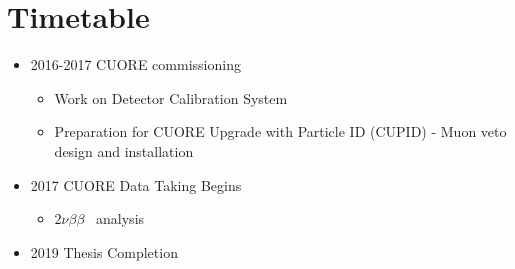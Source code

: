 \documentclass[12pt,a4paper]{article}
\newcommand{\twonubb}{$2\nu \beta \beta$}
\begin{document}
\section{Timetable}
\begin{itemize}
\item 2016-2017 CUORE commissioning
\begin{itemize}
\item Work on Detector Calibration System
\item Preparation for CUORE Upgrade with Particle ID (CUPID) - Muon veto design and installation
\end{itemize}
\item 2017 CUORE Data Taking Begins
\begin{itemize}
\item \twonubb~ analysis
\end{itemize}
\item 2019 Thesis Completion
\end{itemize}

\begin{comment}
\begin{thebibliography}{8}
\bibitem{Higgs-ATLAS}
ATLAS Collaboration. Phys. Lett. B \textbf{716} (2012) 1
\bibitem{Higgs-CMS}
CMS Collaboration. Phys. Lett. B \textbf{716} (2012) 30
\bibitem{Homestake Neutrino}
R. Davis, D. Harmer, K. Hoffman. Phys. Rev. Lett. \textbf{20}, 1205 (1968)
\bibitem{Super-K} Super-Kamiokande Collaboration. Phys. Rev. Lett. \textbf{81}, 1562 (1998)
\bibitem{Sudbury Neutrino}
SNO Collaboration. Phys. Rev. Lett. \textbf{87}, 071301 (2001)
\bibitem{Sakharov}
A. D. Sakharov. Pisma Zh. Eksp. Teor. Fiz., \textbf{5}:32-35, 1967
\bibitem{zeronubb_PhaseSpace}
J. Barea, J. Kotila, F. Iachello. Phys. Rev. C \textbf{87} (2013) 014315
\bibitem{Sensitivity Calculation}
F. Alessandra, R. Ardito, D. R. Artusa et. al. (2011) p. 14 \url{arXiv:1109.0494}  \textcolor{blue}{check link}
\bibitem{Te130 Abundance}
M. A. Fehr, M. Rehk{\"a}mper, A. N. Halliday. Int. J. Mass Spectom. \textbf{232}, 83 (2004)
\bibitem{QValue_1}
M. Redshaw, B.J. Mount, E.G. Myers, and F.T. Avignone, III. Phys. Rev. Lett. \textbf{102} (2009) 212502
\bibitem{QValue_2}
N.D. Scielzo et al., Phys. Rev. C \textbf{80} (2009) 025501
\bibitem{QValue_3}
S. Rahaman et al. Phys. Lett. B \textbf{703} (2011) 412
\bibitem{0nu_LongAnalysisPaper}
CUORE Collaboration. Eur. Phys. J. C \textbf{74}, 2956 (2014)
\bibitem{CUORE_DetectorPaper}
C. Alduino et al 2016 \textit{JINST} \textbf{11} P07009
\bibitem{Geant4_1}
J. Allision, et al. \textit{IEEE Transactions on Nuclear Science} \textbf{53}, 270-278 (2006)
\bibitem{Geant4_2}
S. Agostinelli, et al. \textit{Nuclear Instruments and Methods A} \textbf{50}, 250-303 (2003)

\end{thebibliography}
\end{comment}



\end{document}

